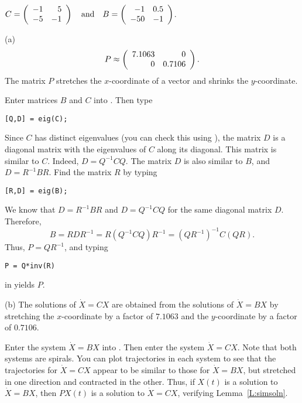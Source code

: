\documentclass{ximera}
\begin{document}
\begin{computerExercise} \label{E:simb}
$C = \left(\begin{array}{rr} -1 & 5\\ -5 &-1\end{array}\right) \quad\mbox{and}\quad B = \left(\begin{array}{rr} -1 & 0.5\\ -50 &-1\end{array}\right)$.

\begin{solution}

(a) \ans
\[
P \approx \left(\begin{array}{rr} 7.1063 & 0\\ 0 &0.7106\end{array}\right).
\]
The matrix $P$ stretches the $x$-coordinate of a vector and shrinks the
$y$-coordinate.

\soln Enter matrices $B$ and $C$ into \Matlabp.  Then type
\begin{verbatim}
[Q,D] = eig(C);
\end{verbatim}
Since $C$ has distinct eigenvalues (you can check this using
\Matlabp), the matrix $D$ is a diagonal matrix with the eigenvalues of
$C$ along its diagonal.  This matrix is similar to $C$.  Indeed, $D =
Q^{-1}CQ$.  The matrix $D$ is also similar to $B$, and $D= R^{-1}BR$.
Find the matrix $R$ by typing
\begin{verbatim}
[R,D] = eig(B);
\end{verbatim}
We know that $D = R^{-1}BR$ and $D = Q^{-1}CQ$ for the same diagonal
matrix $D$.  Therefore,
\[
B = RDR^{-1} = R(Q^{-1}CQ)R^{-1} = (QR^{-1})^{-1}C(QR).
\]
Thus, $P = QR^{-1}$, and typing
\begin{verbatim}
P = Q*inv(R)
\end{verbatim}
in \Matlab yields $P$.

(b) \ans The solutions of $\dot{X} = CX$ are obtained from the solutions
of $\dot{X} = BX$ by stretching the $x$-coordinate by a factor of $7.1063$
and the $y$-coordinate by a factor of $0.7106$.

\soln Enter the system $\dot{X} = BX$ into {\pplane}.  Then enter the
system $\dot{X} = CX$.  Note that both systems are spirals.  You can
plot trajectories in each system to see that the trajectories for
$\dot{X} = CX$ appear to be similar to those for $\dot{X} = BX$, but
stretched in one direction and contracted in the other.  Thus, if
$X(t)$ is a solution to $\dot{X} = BX$, then $PX(t)$ is a solution to
$\dot{X} = CX$, verifying Lemma~\ref{L:simsoln}.

\end{solution}
\end{computerExercise}
\end{document}
